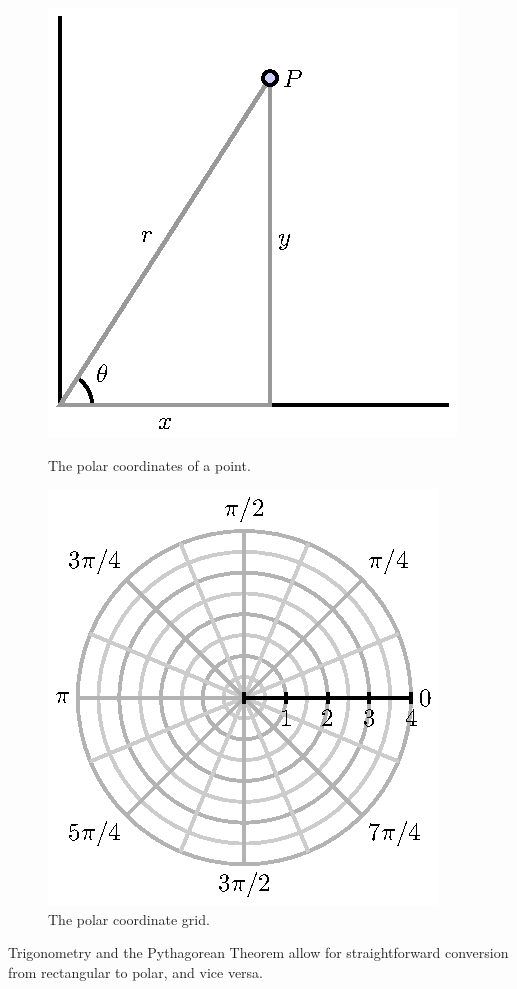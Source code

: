 \begin{figure}[ht]
\begin{center}
\begin{minipage}{2.5in}
\begin{center}
  \includegraphics{figures/fig_11_5_polar_def.eps}
\end{center}
\caption{The polar coordinates of a point.}
\label{F:11.5.Polar_coords}
\end{minipage} \hspace{0.5in}
\begin{minipage}{2.5in}
\begin{center}
  \includegraphics{figures/fig_11_5_polar_grid.eps}
\end{center}
\caption{The polar coordinate grid.}
\label{F:11.5.Polar_grid}
\end{minipage}
\end{center}
\end{figure}
Trigonometry and the Pythagorean Theorem allow for straightforward conversion from rectangular to polar, and vice versa.

